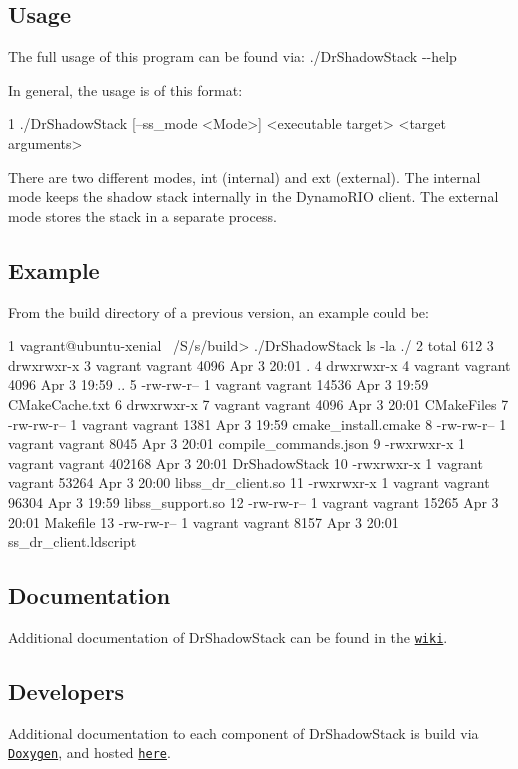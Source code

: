\subsection*{Usage}

The full usage of this program can be found via\+: {\ttfamily ./\+Dr\+Shadow\+Stack -\/-\/help}

In general, the usage is of this format\+: 
\begin{DoxyCode}
1 ./DrShadowStack [--ss\_mode <Mode>] <executable target> <target arguments>
\end{DoxyCode}


There are two different modes, {\ttfamily int} (internal) and {\ttfamily ext} (external). The internal mode keeps the shadow stack internally in the Dynamo\+R\+IO client. The external mode stores the stack in a separate process.

\subsection*{Example}

From the build directory of a previous version, an example could be\+: 
\begin{DoxyCode}
1 vagrant@ubuntu-xenial ~/S/s/build> ./DrShadowStack ls -la ./
2 total 612
3 drwxrwxr-x 3 vagrant vagrant   4096 Apr  3 20:01 .
4 drwxrwxr-x 4 vagrant vagrant   4096 Apr  3 19:59 ..
5 -rw-rw-r-- 1 vagrant vagrant  14536 Apr  3 19:59 CMakeCache.txt
6 drwxrwxr-x 7 vagrant vagrant   4096 Apr  3 20:01 CMakeFiles
7 -rw-rw-r-- 1 vagrant vagrant   1381 Apr  3 19:59 cmake\_install.cmake
8 -rw-rw-r-- 1 vagrant vagrant   8045 Apr  3 20:01 compile\_commands.json
9 -rwxrwxr-x 1 vagrant vagrant 402168 Apr  3 20:01 DrShadowStack
10 -rwxrwxr-x 1 vagrant vagrant  53264 Apr  3 20:00 libss\_dr\_client.so
11 -rwxrwxr-x 1 vagrant vagrant  96304 Apr  3 19:59 libss\_support.so
12 -rw-rw-r-- 1 vagrant vagrant  15265 Apr  3 20:01 Makefile
13 -rw-rw-r-- 1 vagrant vagrant   8157 Apr  3 20:01 ss\_dr\_client.ldscript
\end{DoxyCode}


\subsection*{Documentation}

Additional documentation of Dr\+Shadow\+Stack can be found in the \href{https://github.com/zwimer/DrShadowStack/wiki}{\tt wiki}.

\subsection*{Developers}

Additional documentation to each component of Dr\+Shadow\+Stack is build via \href{http://www.stack.nl/~dimitri/doxygen/}{\tt Doxygen}, and hosted \href{https://zwimer.com/DrShadowStack}{\tt here}. 